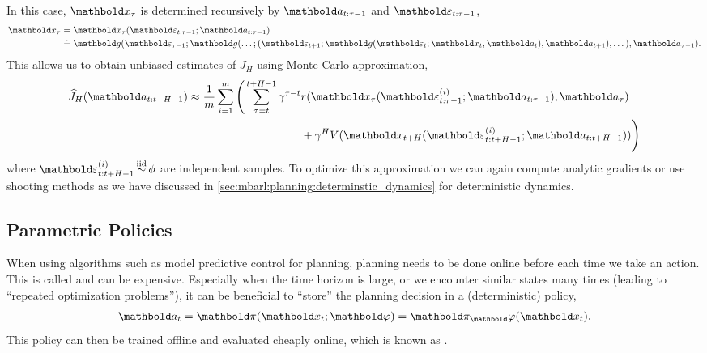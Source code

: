 In this case, $\vx_\tau$ is determined recursively by $\va_{t:\tau-1}$ and $\vvarepsilon_{t:\tau-1}$, \begin{align}\begin{split}
  \vx_\tau &= \vx_\tau(\vvarepsilon_{t:\tau-1}; \va_{t:\tau-1}) \\
  &\defeq \vg(\vvarepsilon_{\tau-1}; \vg(\dots; (\vvarepsilon_{t+1}; \vg(\vvarepsilon_t; \vx_t, \va_t), \va_{t+1}), \dots), \va_{\tau-1}). \label{eq:state_encoding}
\end{split}\end{align}
This allows us to obtain unbiased estimates of $J_H$ using Monte Carlo approximation, \begin{align}\begin{split}
  \J{\va_{t:t+H-1}}[H] \approx \begin{multlined}[t]
    \frac{1}{m} \sum_{i=1}^m \Bigg( \sum_{\tau=t}^{t+H-1} \gamma^{\tau-t} r(\vx_\tau(\vvarepsilon_{t:\tau-1}^{(i)}; \va_{t:\tau-1}), \va_\tau) \\ + \gamma^H \V{\vx_{t+H}(\vvarepsilon_{t:t+H-1}^{(i)}; \va_{t:t+H-1})} \Bigg)
  \end{multlined} \label{eq:mbarl_planning_monte_carlo}
\end{split}\end{align} where $\vvarepsilon_{t:t+H-1}^{(i)} \iid \phi$ are independent samples.
To optimize this approximation we can again compute analytic gradients or use shooting methods as we have discussed in \cref{sec:mbarl:planning:determinstic_dynamics} for deterministic dynamics.

\subsection{Parametric Policies}\label{sec:mbarl:planning:parametric_policies}

When using algorithms such as model predictive control for planning, planning needs to be done online before each time we take an action.
This is called  and can be expensive.
Especially when the time horizon is large, or we encounter similar states many times (leading to ``repeated optimization problems''), it can be beneficial to ``store'' the planning decision in a (deterministic) policy, \begin{align}
  \va_t = \vpi(\vx_t; \vvarphi) \eqdef \vpi_\vvarphi(\vx_t).
\end{align}
This policy can then be trained offline and evaluated cheaply online, which is known as .

